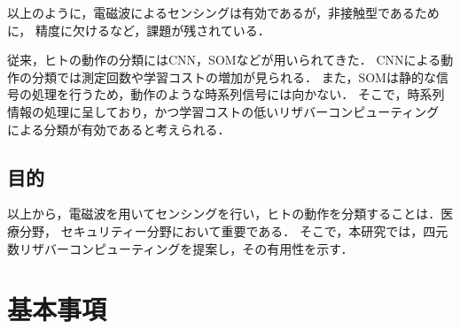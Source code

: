 \documentclass[uplatex,a4paper,10pt]{jsarticle}
\begin{document}
以上のように，電磁波によるセンシングは有効であるが，非接触型であるために，
精度に欠けるなど，課題が残されている．

従来，ヒトの動作の分類にはCNN，SOMなどが用いられてきた\cite{cnn}\cite{som}．
CNNによる動作の分類では測定回数や学習コストの増加が見られる．
また，SOMは静的な信号の処理を行うため，動作のような時系列信号には向かない．
そこで，時系列情報の処理に呈しており，かつ学習コストの低いリザバーコンピューティング
による分類が有効であると考えられる．

\subsection{目的}
以上から，電磁波を用いてセンシングを行い，ヒトの動作を分類することは．医療分野，
セキュリティー分野において重要である．
そこで，本研究では，四元数リザバーコンピューティングを提案し，その有用性を示す．

\section{基本事項}\label{section:2}
\end{document}
